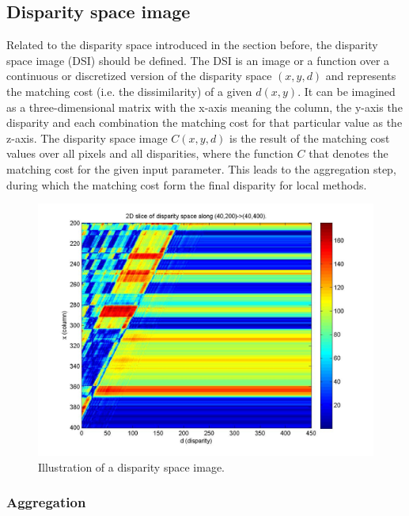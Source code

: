 \newpage

\subsection*{Disparity space image}

Related to the disparity space introduced in the section before, the disparity space image (DSI) should be defined.
The DSI is an image or a function over a continuous or discretized version of the disparity space $(x,y,d)$ and represents the matching cost (i.e. the dissimilarity) of a given $d(x,y)$.
It can be imagined as a three-dimensional matrix with the x-axis meaning the column, the y-axis the disparity and each combination the matching cost for that particular value as the z-axis.
The disparity space image $C(x,y,d)$ is the result of the matching cost values over all pixels and all disparities, where the function $C$ that denotes the matching cost for the given input parameter.
This leads to the aggregation step, during which the matching cost form the final disparity for local methods.

\begin{figure}[h!]
  \centering
  \includegraphics[width=1.0\textwidth]{src/images/dsi.png}
  \caption[Disparity space image]{Illustration of a disparity space image.\protect\footnotemark}
  \label{fig:dsi}
\end{figure}

\subsubsection{Aggregation}

